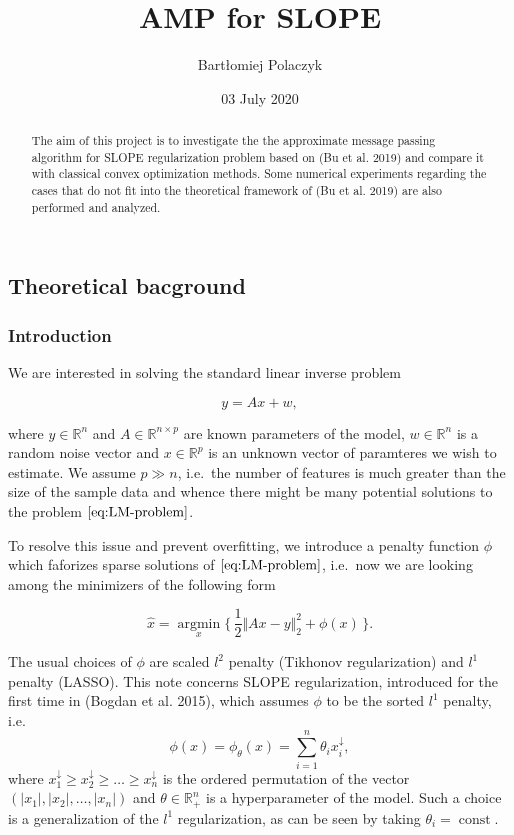 \documentclass[]{article}
\title{AMP for SLOPE}
\author{Bartłomiej Polaczyk}
\date{03 July 2020}
\begin{document}
\maketitle
\begin{abstract}
The aim of this project is to investigate the the approximate message
passing algorithm for SLOPE regularization problem based on (Bu et al.
2019) and compare it with classical convex optimization methods. Some
numerical experiments regarding the cases that do not fit into the
theoretical framework of (Bu et al. 2019) are also performed and
analyzed.
\end{abstract}

\newcommand{\R}{\mathbb{R}}
\newcommand{\E}{\mathbb{E}}

\subsection{Theoretical bacground}\label{theoretical-bacground}

\subsubsection{Introduction}\label{introduction}

We are interested in solving the standard linear inverse problem

\begin{equation}\label{eq:LM-problem} 
  y = Ax + w,
\end{equation}

where \(y\in \R^n\) and \(A\in\R^{n\times p}\) are known parameters of
the model, \(w\in\R^n\) is a random noise vector and \(x\in\R^p\) is an
unknown vector of paramteres we wish to estimate. We assume \(p\gg n\),
i.e.~the number of features is much greater than the size of the sample
data and whence there might be many potential solutions to the
problem\(~\eqref{eq:LM-problem}\).

To resolve this issue and prevent overfitting, we introduce a penalty
function \(\phi\) which faforizes sparse solutions
of\(~\eqref{eq:LM-problem}\), i.e.~now we are looking among the
minimizers of the following form

\begin{equation}\label{eq:SLOPE}
  \widehat{x} = \operatorname*{argmin}_x \{\, \frac{1}{2}\Vert Ax - y \Vert_2^2 + \phi(x) \,\}.
\end{equation}

The usual choices of \(\phi\) are scaled \(l^2\) penalty (Tikhonov
regularization) and \(l^1\) penalty (LASSO). This note concerns SLOPE
regularization, introduced for the first time in (Bogdan et al. 2015),
which assumes \(\phi\) to be the sorted \(l^1\) penalty, i.e. \[
  \phi(x)= \phi_{\theta}(x) = \sum_{i=1}^n \theta_ix_i^{\downarrow},
\] where
\(x_1^\downarrow \ge x_2^\downarrow \ge \ldots \ge x_n^\downarrow\) is
the ordered permutation of the vector
\((\vert x_1\vert,\vert x_2\vert,\ldots,\vert x_n\vert)\) and
\(\theta\in\R_+^n\) is a hyperparameter of the model. Such a choice is a
generalization of the \(l^1\) regularization, as can be seen by taking
\(\theta_i=\operatorname{const}\).
\end{document}
